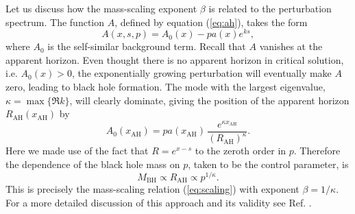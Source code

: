 Let us discuss how the mass-scaling exponent $\beta$ is related to the
perturbation spectrum. The function $A$, defined by equation
(\ref{eq:ah}), takes the form
\begin{equation} \label{eq:pert:A}
  A(x,s,p) = A_0(x) - p a(x) e^{ks},
\end{equation}
where $A_0$ is the self-similar background term. Recall that $A$
vanishes at the apparent horizon. Even thought there is no apparent
horizon in critical solution, i.e. $A_0(x)>0$, the exponentially
growing perturbation will eventually make $A$ zero, leading to black
hole formation. The mode with the largest eigenvalue,
$\kappa=\max\{\Re k\}$, will clearly dominate, giving the position of
the apparent horizon $R_{\text{AH}}(x_{\text{AH}})$ by
\begin{equation} \label{eq:pert:ah}
  A_0(x_{\text{AH}}) = p a(x_{\text{AH}}) \,
    \frac{e^{\kappa x_{\text{AH}}}}{(R_{\text{AH}})^\kappa}.
\end{equation}
Here we made use of the fact that $R=e^{x-s}$ to the zeroth order in
$p$. Therefore the dependence of the black hole mass on $p$, taken to
be the control parameter, is
\begin{equation} \label{eq:pert:scaling}
  M_{\text{BH}} \propto R_{\text{AH}} \propto p^{1/\kappa}.
\end{equation}
This is precisely the mass-scaling relation (\ref{eq:scaling}) with
exponent $\beta=1/\kappa$. For a more detailed discussion of this
approach and its validity see Ref. \cite{Hara&Koike&Adachi:96}.

